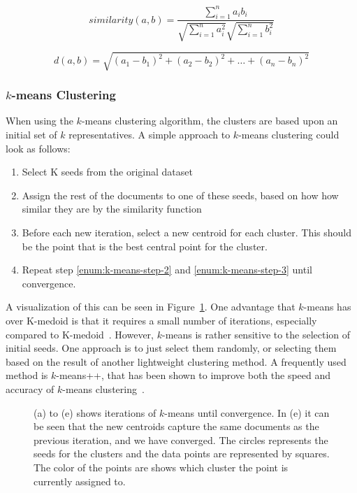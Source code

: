 \begin{equation}\label{eq:cosine}
    similarity(a, b) = \frac{\sum_{i=1}^n a_i b_i}{\sqrt{\sum_{i=1}^n a_i^2}\sqrt{\sum_{i=1}^n b_i^2}}
\end{equation}

\begin{equation}\label{eq:euclidean}
    d(a, b) = \sqrt{(a_1 - b_1)^2 + (a_2 - b_2)^2 + \hdots + (a_n - b_n)^2}
\end{equation}

\subsubsection{$k$-means Clustering}\label{sec:k-mean}

When using the $k$-means clustering algorithm, the clusters are based upon an initial set of $k$ representatives.
A simple approach to $k$-means clustering could look as follows:

\begin{enumerate}
    \item Select K seeds from the original dataset
    \item \label{enum:k-means-step-2} Assign the rest of the documents to one of these seeds, based on how how similar they are by the similarity function
    \item \label{enum:k-means-step-3} Before each new iteration, select a new centroid for each cluster. This should be the point that is the best central point for the cluster.
    \item Repeat step \ref{enum:k-means-step-2} and \ref{enum:k-means-step-3} until convergence.
\end{enumerate}

A visualization of this can be seen in Figure~\ref{fig:kmeans-iterations}.
One advantage that $k$-means has over K-medoid is that it requires a small number of iterations, especially compared to K-medoid~\cite{aggarwal2012survey, schutze1997projections}.
However, $k$-means is rather sensitive to the selection of initial seeds.
One approach is to just select them randomly, or selecting them based on the result of another lightweight clustering method.
A frequently used method is $k$-means++, that has been shown to improve both the speed and accuracy of $k$-means clustering~\cite{arthur2007k}.

\begin{figure}
    \centering
    \quad
    \caption{(a) to (e) shows iterations of $k$-means until convergence.
        In (e) it can be seen that the new centroids capture the same documents as the previous iteration, and we have converged.
        The circles represents the seeds for the clusters and the data points are represented by squares.
        The color of the points are shows which cluster the point is currently assigned to.}
    \label{fig:kmeans-iterations}
\end{figure}

